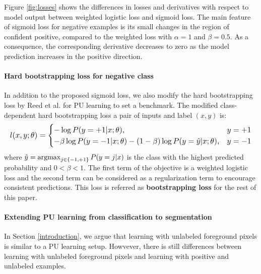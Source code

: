 Figure \ref{fig:losses} shows the differences in losses and derivatives with respect to model output between weighted logistic loss and sigmoid loss.
The main feature of sigmoid loss for negative examples is its small changes in the region of confident positive, compared to the weighted loss with $\alpha=1$ and $\beta=0.5$.
As a consequence, the corresponding derivative decreases to zero as the model prediction increases in the positive direction.


\paragraph{Hard bootstrapping loss for negative class}
In addition to the proposed sigmoid loss, we also modify the hard bootstrapping loss by Reed et al. \cite{reed2014training} for PU learning to set a benchmark.
The modified class-dependent hard bootstrapping loss a pair of inputs and label $(x,y)$ is:
\begin{equation*}
\resizebox{\columnwidth}{!}{$
  l(x, y; \theta) =
    \begin{cases}
      - \log P(y=+1 \vert x; \theta), & y = +1 \\
      - \beta \log P(y=-1 \vert x;\theta) - (1-\beta) \log P(y=\hat{y} \vert x;\theta), & y = -1
    \end{cases}
$}
\end{equation*}
where $\hat{y} = \operatorname*{argmax}_{j\in\{-1,+1\}}{P(y=j \vert x)}$ is the class with the highest predicted probability and $0<\beta<1$.
The first term of the objective is a weighted logistic loss and the second term can be considered as a regularization term to encourage consistent predictions.
This loss is referred as \textbf{bootstrapping loss} for the rest of this paper.

\paragraph{Extending PU learning from classification to segmentation}
In Section \ref{introduction}, we argue that learning with unlabeled foreground pixels is similar to a PU learning setup.
Howvever, there is still differences between learning with unlabeled foreground pixels and learning with positive and unlabeled examples.

